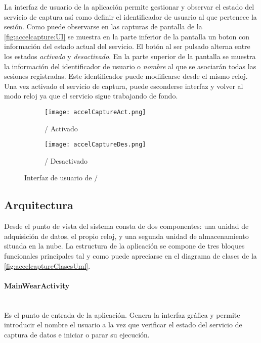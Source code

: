 La interfaz de usuario de la aplicación permite gestionar y observar el estado del servicio de captura así como definir el identificador de usuario al que pertenece la sesión. Como puede observarse en las capturas de pantalla de la \autoref{fig:accelcapture:UI} se muestra en la parte inferior de la pantalla un boton con información del estado actual del servicio. El botón al ser pulsado alterna entre los estados \textit{activado} y \textit{desactivado}. En la parte superior de la pantalla se muestra la información del identificador de usuario o \textit{nombre} al que se asociarán todas las sesiones registradas. Este identificador puede modificarse desde el mismo reloj. Una vez activado el servicio de captura, puede esconderse interfaz y volver al modo reloj ya que el servicio sigue trabajando de fondo.
\begin{figure}[htb!]
  \centering
  \begin{subfigure}[b]{0.30\textwidth}
      \centering
      \texttt{[image: accelCaptureAct.png]}
      \caption{\accelcapture/ Activado}
      \label{fig:accelCapture:UI1}
  \end{subfigure}
  \hfill
  \begin{subfigure}[b]{0.30\textwidth}
      \centering
      \texttt{[image: accelCaptureDes.png]}
      \caption{\accelcapture/ Desactivado}
      \label{fig:accelCapture:UI2}
  \end{subfigure}
  \hfill
  \caption{\label{fig:accelcapture:UI} Interfaz de usuario de \accelcapture/}
\end{figure}


\subsection{Arquitectura}\label{sub:accelcapture:archi}


Desde el punto de vista del sistema consta de dos componentes: una unidad de adquisición de datos, el propio reloj, y una segunda unidad de almacenamiento situada en la nube. La estructura de la aplicación se compone de tres bloques funcionales principales tal y como puede apreciarse en el diagrama de clases de la \autoref{fig:accelcaptureClasesUml}.



\paragraph{MainWearActivity}\\
Es el punto de entrada de la aplicación. Genera la interfaz gráfica y permite introducir el nombre el usuario a la vez que verificar el estado del servicio de captura de datos e iniciar o parar su ejecución.

